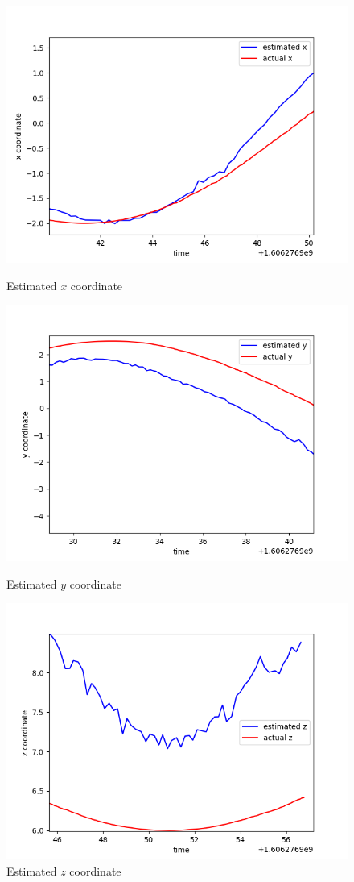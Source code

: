 \documentclass[11pt]{article}
\begin{document}
\begin{figure}[!htb]
    \includegraphics[width=\linewidth]{../figures/est_x_pos.png}
    \caption{Estimated $x$ coordinate}
\endminipage\hfill
{}
    \includegraphics[width=\linewidth]{../figures/est_y_pos.png}
    \caption{Estimated $y$ coordinate}
\endminipage\hfill
{}
    \includegraphics[width=\linewidth]{../figures/est_z_pos.png}
    \caption{Estimated $z$ coordinate}
\endminipage\hfill
\end{figure}
\end{document}
